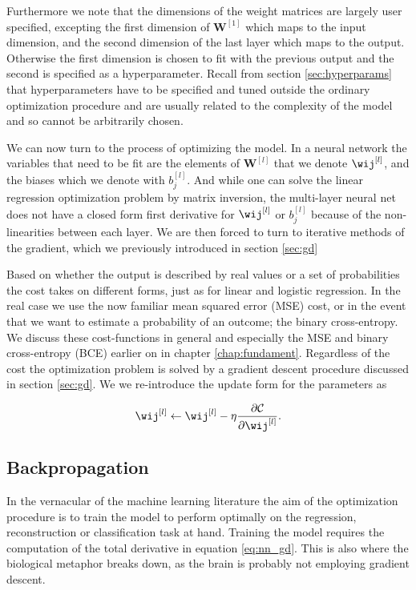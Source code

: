 \noindent Furthermore we note that the dimensions of the weight matrices are largely user specified, excepting the first dimension of $\mathbf{W}^{[1]}$ which maps to the input dimension, and the second dimension of the last layer which maps to the output. Otherwise the first dimension is chosen to fit with the previous output and the second is specified as a hyperparameter. Recall from section \ref{sec:hyperparams} that hyperparameters have to be specified and tuned outside the ordinary optimization procedure and are usually related to the complexity of the model and so cannot be arbitrarily chosen. 

We can now turn to the process of optimizing the model. In a neural network the variables that need to be fit are the elements of $\mathbf{W}^{[l]}$ that we denote $\wij^{[l]}$, and the biases which we denote with $b_j^{[l]}$. And while one can solve the linear regression optimization problem by matrix inversion, the multi-layer neural net does not have a closed form first derivative for $\wij^{[l]}$ or  $b_j^{[l]}$ because of the non-linearities between each layer. We are then forced to turn to iterative methods of the gradient, which we previously introduced in section \ref{sec:gd}

Based on whether the output is described by real values or a set of probabilities the cost takes on different forms, just as for linear and logistic regression. In the real case we use the now familiar mean squared error (MSE) cost, or in the event that we want to estimate a probability of an outcome; the binary cross-entropy. We discuss these cost-functions in general and especially the MSE and binary cross-entropy (BCE) earlier on in chapter \ref{chap:fundament}. Regardless of the cost the optimization problem is solved by a gradient descent procedure discussed in section \ref{sec:gd}. We we re-introduce the update form for the parameters as 

\begin{equation}\label{eq:nn_gd}
	\wij^{[l]} \leftarrow \wij^{[l]} -\eta \frac{\partial \mathcal{C}}{\partial \wij^{[l]}} .
\end{equation}

\subsection{Backpropagation}\label{sec:backpropagation}

In the vernacular of the machine learning literature the aim of the optimization procedure is to train the model to perform optimally on the regression, reconstruction or classification task at hand. Training the model requires the computation of the total derivative in equation \ref{eq:nn_gd}. This is also where the biological metaphor breaks down, as the brain is probably not employing gradient descent.

